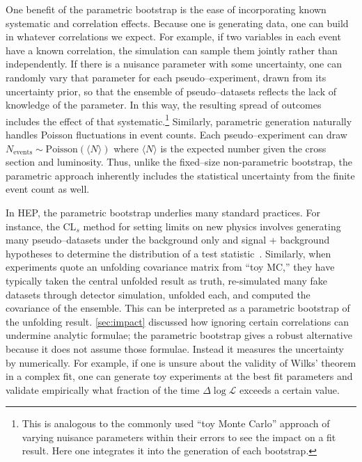             One benefit of the parametric bootstrap is the ease of incorporating known systematic and correlation effects.
            Because one is generating data, one can build in whatever correlations we expect.
            For example, if two variables in each event have a known correlation, the simulation can sample them jointly rather than independently.
            If there is a nuisance parameter with some uncertainty, one can randomly vary that parameter for each pseudo--experiment, drawn from its uncertainty prior, so that the ensemble of pseudo--datasets reflects the lack of knowledge of the parameter.
            In this way, the resulting spread of outcomes includes the effect of that systematic.\footnote{
                This is analogous to the commonly used ``toy Monte Carlo'' approach of varying nuisance parameters within their errors to see the impact on a fit result.
                Here one integrates it into the generation of each bootstrap.
            }
            Similarly, parametric generation naturally handles Poisson fluctuations in event counts.
            Each pseudo--experiment can draw $N_{\text{events}} \sim \text{Poisson}(\langle N \rangle)$ where $\langle N \rangle$ is the expected number given the cross section and luminosity.
            Thus, unlike the fixed--size non-parametric bootstrap, the parametric approach inherently includes the statistical uncertainty from the finite event count as well.

            In HEP, the parametric bootstrap underlies many standard practices.
            For instance, the CL$_s$ method for setting limits on new physics involves generating many pseudo--datasets under the background only and signal + background hypotheses to determine the distribution of a test statistic~\cite{Read:2002hq, Harel:2011jyp, mandelkern_setting_2002, giere_allan_1977, Zech:1988un, birnbaum_foundations_1962, birnbaum_neyman-pearson_1977, Cowan2011AsymptoticPhysics, Fraser:2004ty, cousins_negatively_2011}.
            Similarly, when experiments quote an unfolding covariance matrix from ``toy MC,'' they have typically taken the central unfolded result as truth, re-simulated many fake datasets through detector simulation, unfolded each, and computed the covariance of the ensemble.
            This can be interpreted as a parametric bootstrap of the unfolding result.
            \cref{sec:impact} discussed how ignoring certain correlations can undermine analytic formulae;
            the parametric bootstrap gives a robust alternative because it does not assume those formulae.
            Instead it measures the uncertainty by numerically.
            For example, if one is unsure about the validity of Wilks' theorem in a complex fit, one can generate toy experiments at the best fit parameters and validate empirically what fraction of the time $\Delta\log\mathcal{L}$ exceeds a certain value.

